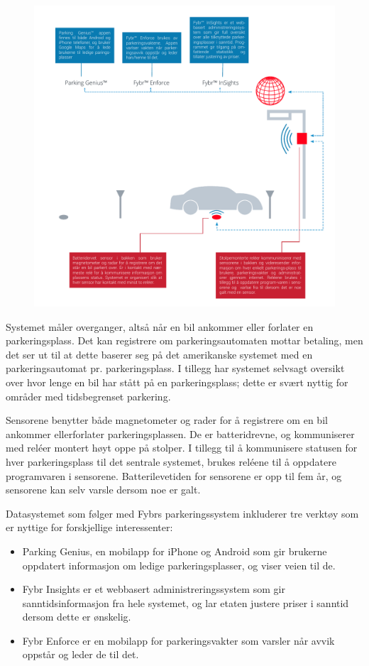 \documentclass[a4paper, norsk, 12pt]{article}
\theoremstyle{remark}
\begin{document}
\begin{figure}[H]
\centering
\centerline{\includegraphics[scale=1.0, clip=true, trim=1cm 0.5cm 0.5cm 0.5cm]{grafikk/fybr.pdf}}
\end{figure}

Systemet måler overganger, altså når en bil ankommer eller forlater en parkeringsplass. Det kan registrere om parkeringsautomaten mottar betaling, men det ser ut til at dette baserer seg på det amerikanske systemet med en parkeringsautomat pr. parkeringsplass. I tillegg har systemet selvsagt oversikt over hvor lenge en bil har stått på en parkeringsplass; dette er svært nyttig for områder med tidsbegrenset parkering.

Sensorene benytter både magnetometer og rader for å registrere om en bil ankommer ellerforlater parkeringsplassen. De er batteridrevne, og kommuniserer med reléer montert høyt oppe på stolper. I tillegg til å kommunisere statusen for hver parkeringsplass til det sentrale systemet, brukes reléene til å oppdatere programvaren i sensorene. Batterilevetiden for sensorene er opp til fem år, og sensorene kan selv varsle dersom noe er galt. 

Datasystemet som følger med Fybrs parkeringssystem inkluderer tre verktøy som er nyttige for forskjellige interessenter:

\begin{itemize}
	\item Parking Genius, en mobilapp for iPhone og Android  som gir brukerne oppdatert informasjon om ledige parkeringsplasser, og viser veien til de.
	\item Fybr Insights er et webbasert administreringssystem som gir sanntidsinformasjon fra hele systemet, og lar etaten justere priser i sanntid dersom dette er ønskelig.
	\item Fybr Enforce er en mobilapp for parkeringsvakter som varsler når avvik oppstår og leder de til det.
\end{itemize}
\end{document}
